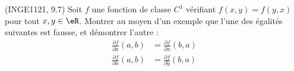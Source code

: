 
\begin{exercice}\label{exoDerrivePartielle-0001}

	(INGE1121, 9.7) Soit $f$ une fonction de classe $C^1$ vérifiant $f(x,y)=f(y,x)$ pour tout $x,y\in\eR$. Montrer au moyen d'un exemple que l'une des égalités suivantes est fausse, et démontrer l'autre :
	\begin{subequations}
		\begin{align}
			\frac{ \partial f }{ \partial x }(a,b)&=\frac{ \partial f }{ \partial x }(b,a)		\label{subEqDPZUa}\\
			\frac{ \partial f }{ \partial x }(a,b)&=\frac{ \partial f }{ \partial y }(b,a)		\label{subEqDPZUb}\\
		\end{align}
	\end{subequations}

\end{exercice}

